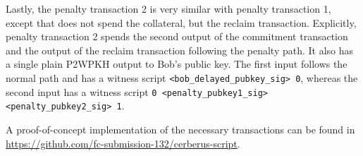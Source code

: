\documentclass[runningheads]{llncs}
\begin{document}
Lastly, the penalty transaction 2 is very similar with penalty transaction 1, except that does not spend the collateral, but the reclaim transaction. Explicitly, penalty transaction 2 spends the second output of the commitment transaction and the output of the reclaim transaction following the penalty path. It also has a single plain P2WPKH output to Bob's public key. The first input follows the normal path and has a witness script \texttt{<bob\_delayed\_pubkey\_sig> 0}, whereas the second input has a witness script \texttt{0 <penalty\_pubkey1\_sig> <penalty\_pubkey2\_sig> 1}.

A proof-of-concept implementation of the necessary transactions can be found in
\url{https://github.com/fc-submission-132/cerberus-script}.
 \fi
\end{document}
